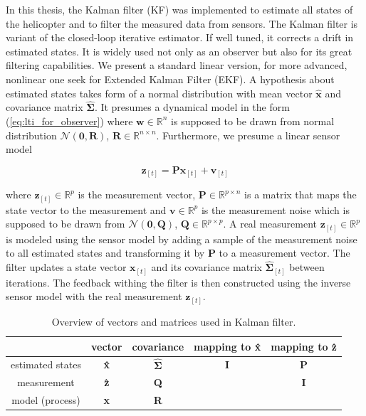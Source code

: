 In this thesis, the Kalman filter (KF) was implemented to estimate all states of the helicopter and to filter the measured data from sensors. The Kalman filter is variant of the closed-loop iterative estimator. If well tuned, it corrects a drift in estimated states. It is widely used not only as an observer but also for its great filtering capabilities. We present a standard linear version, for more advanced, nonlinear one seek for Extended Kalman Filter (EKF). A hypothesis about estimated states takes form of a normal distribution with mean vector $\hat{\textbf{x}}$ and covariance matrix $\hat{\boldsymbol{\Sigma}}$. It presumes a dynamical model in the form (\ref{eq:lti_for_observer}) where $\textbf{w} \in \mathbb{R}^n$ is supposed to be drawn from normal distribution $\mathcal{N}(\textbf{0}, \textbf{R})$, $\textbf{R} \in \mathbb{R}^{n\times n}$. Furthermore, we presume a linear sensor model

\begin{equation}
\textbf{\^z}_{[t]} = \textbf{P}\textbf{\^x}_{[t]} + \textbf{v}_{[t]}
\end{equation}

where $\textbf{\^z}_{[t]} \in \mathbb{R}^p$ is the measurement vector, $\textbf{P} \in \mathbb{R}^{p \times n}$ is a matrix that maps the state vector to the measurement and $\textbf{v} \in \mathbb{R}^p$ is the measurement noise which is supposed to be drawn from $\mathcal{N}(\textbf{0}, \textbf{Q})$, $\textbf{Q} \in \mathbb{R}^{p \times p}$. A real measurement $\textbf{z}_{[t]} \in \mathbb{R}^p$ is modeled using the sensor model by adding a sample of the measurement noise to all estimated states and transforming it by \textbf{P} to a measurement vector. The filter updates a state vector $\textbf{\^x}_{[t]}$ and its covariance matrix $\hat{\boldsymbol{\Sigma}}_{[t]}$ between iterations. The feedback withing the filter is then constructed using the inverse sensor model with the real measurement $\textbf{z}_{[t]}$.

\begin{table}[h]
\centering
\begin{tabular}{ccccc}
\hline
& vector & covariance & mapping to \textbf{\^x} & mapping to \textbf{\^z}\\
\hline
estimated states & \textbf{\^x} & $\hat{\boldsymbol{\Sigma}}$ & \textbf{I} & \textbf{P}\\
measurement & \textbf{\^z} & \textbf{Q} & & \textbf{I}\\
model (process) & \textbf{x} & \textbf{R} & & \\
\hline
\end{tabular}
\caption{Overview of vectors and matrices used in Kalman filter.}
\label{tab:matrices_in_kalman}
\end{table}

